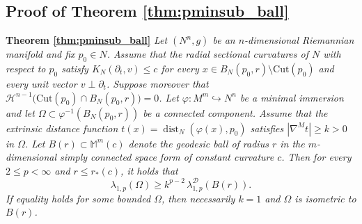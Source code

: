 \documentclass{article}
\begin{document}
\subsection{Proof of Theorem \ref{thm:pminsub_ball}}
\medskip

\noindent
\textbf{Theorem \ref{thm:pminsub_ball}} \textit{
Let $(N^n,g)$ be an $n$-dimensional Riemannian manifold and fix $p_0\in N$. Assume that the radial sectional curvatures of $N$ with respect to $p_0$ satisfy $K_N(\partial_t,v) \leq c$ for every $x\in B_N(p_0,r)\setminus \mathrm{Cut}(p_0)$ and every unit vector 
$v\perp \partial_t$. Suppose moreover that $\mathcal{H}^{n-1}\!\big(\mathrm{Cut}(p_0)\cap B_N(p_0,r)\big)=0$. Let $\varphi:M^m\hookrightarrow N^n$ be a minimal immersion and let 
$\Omega\subset \varphi^{-1}(B_N(p_0,r))$ be a connected component. 
Assume that the extrinsic distance function $t(x)=\operatorname{dist}_N(\varphi(x),p_0)$ satisfies $|\nabla^M t|\ge k>0$ in $\Omega$. Let $B(r)\subset \mathbb{M}^m(c)$ denote the geodesic ball of radius $r$ in the 
$m$-dimensional simply connected space form of constant curvature $c$. 
Then for every $2\le p<\infty$ and $r\le r_\ast(c)$, it holds that
\begin{equation}\label{ppBessaMontenegro}
\lambda_{1,p}(\Omega) \geq k^{p-2}\,\lambda_{1,p}^{\mathcal D}(B(r)).    \end{equation}
If equality holds for some bounded $\Omega$, then necessarily 
$k=1$ and $\Omega$ is isometric to $B(r)$.}
\end{document}

